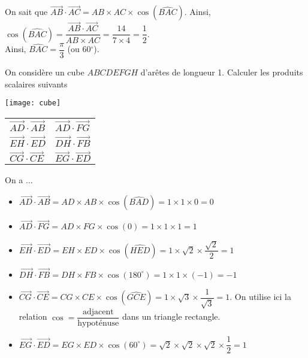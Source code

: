 \documentclass[11pt,fleqn, openany]{book} %
\begin{document}
\begin{solution}On sait que $\overrightarrow{AB}\cdot \overrightarrow{AC}=AB \times AC \times \cos (\widehat{BAC})$. Ainsi, $\cos(\widehat{BAC})=\dfrac{\overrightarrow{AB}\cdot \overrightarrow{AC}}{AB \times AC}=\dfrac{14}{7 \times 4}=\dfrac{1}{2}$. \\ Ainsi, $\widehat{BAC}=\dfrac{\pi}{3}$ (ou 60$^{\circ}$).\end{solution}



\begin{exercise}
On considère un cube $ABCDEFGH$ d'arêtes de longueur 1. Calculer les produits scalaires suivants

\begin{minipage}{0.4\linewidth}
\begin{center}
\texttt{[image: cube]}
\end{center}\end{minipage}\hfill \begin{minipage}{0.5\linewidth}

\begin{tabularx}{\linewidth}{XX}
$\overrightarrow{AD} \cdot \overrightarrow{AB}$ & $\overrightarrow{AD} \cdot \overrightarrow{FG}$ \\
$\overrightarrow{EH} \cdot \overrightarrow{ED}$ & $\overrightarrow{DH} \cdot \overrightarrow{FB}$\\
$\overrightarrow{CG} \cdot \overrightarrow{CE}$ & $\overrightarrow{EG} \cdot \overrightarrow{ED}$

\end{tabularx}

\end{minipage}

\end{exercise}

\begin{solution}On a ...
\begin{itemize}
\item $\overrightarrow{AD} \cdot \overrightarrow{AB} = AD \times AB \times \cos (\widehat{BAD})=1 \times 1 \times 0 = 0$
\item $\overrightarrow{AD} \cdot \overrightarrow{FG} = AD \times FG \times \cos(0)=1 \times 1 \times 1 = 1$ 
\item $\overrightarrow{EH} \cdot \overrightarrow{ED} = EH \times ED \times \cos(\widehat{HED})=1 \times \sqrt{2} \times \dfrac{\sqrt{2}}{2}=1$ 
\item $\overrightarrow{DH} \cdot \overrightarrow{FB} = DH \times FB \times \cos (180^{\circ})=1 \times 1 \times (-1) = -1$
\item $\overrightarrow{CG} \cdot \overrightarrow{CE} = CG \times CE \times \cos(\widehat{GCE})=1 \times \sqrt{3} \times \dfrac{1}{\sqrt{3}}=1$. On utilise ici la relation $\cos = \dfrac{\text{adjacent}}{\text{hypoténuse}}$ dans un triangle rectangle.
\item $\overrightarrow{EG} \cdot \overrightarrow{ED} = EG \times ED \times \cos(60^{\circ})=\sqrt{2} \times \sqrt{2} \times \sqrt{2} \times \dfrac{1}{2} = 1$

\end{itemize}\end{solution}
\end{document}
